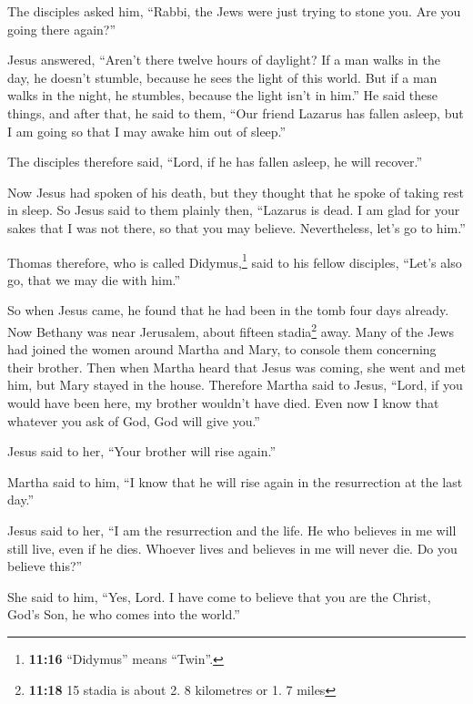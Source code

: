  The disciples asked him, ``Rabbi, the Jews were just
trying to stone you. Are you going there again?''

 Jesus answered, ``Aren't there twelve hours of daylight?
If a man walks in the day, he doesn't stumble, because he sees the light
of this world.  But if a man walks in the night, he
stumbles, because the light isn't in him.''  He said
these things, and after that, he said to them, ``Our friend Lazarus has
fallen asleep, but I am going so that I may awake him out of sleep.''

 The disciples therefore said, ``Lord, if he has fallen
asleep, he will recover.''

 Now Jesus had spoken of his death, but they thought that
he spoke of taking rest in sleep.  So Jesus said to them
plainly then, ``Lazarus is dead.  I am glad for your
sakes that I was not there, so that you may believe. Nevertheless, let's
go to him.''

 Thomas therefore, who is called Didymus,\footnote{\textbf{11:16}
  ``Didymus'' means ``Twin''.} said to his fellow disciples, ``Let's
also go, that we may die with him.''

 So when Jesus came, he found that he had been in the
tomb four days already.  Now Bethany was near Jerusalem,
about fifteen stadia\footnote{\textbf{11:18} 15 stadia is about 2. 8
  kilometres or 1. 7 miles} away.  Many of the Jews had
joined the women around Martha and Mary, to console them concerning
their brother.  Then when Martha heard that Jesus was
coming, she went and met him, but Mary stayed in the house.
 Therefore Martha said to Jesus, ``Lord, if you would
have been here, my brother wouldn't have died.  Even now
I know that whatever you ask of God, God will give you.''

 Jesus said to her, ``Your brother will rise again.''

 Martha said to him, ``I know that he will rise again in
the resurrection at the last day.''

 Jesus said to her, ``I am the resurrection and the life.
He who believes in me will still live, even if he dies. 
Whoever lives and believes in me will never die. Do you believe this?''

 She said to him, ``Yes, Lord. I have come to believe
that you are the Christ, God's Son, he who comes into the world.''

